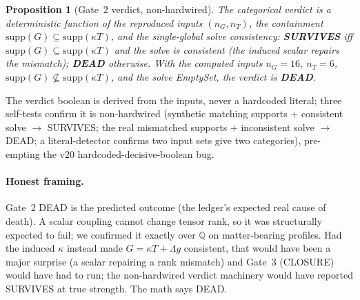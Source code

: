 \documentclass[11pt]{article}
\newtheorem{proposition}{Proposition}
\newcommand{\QQ}{\mathbb{Q}}
\newcommand{\supp}{\mathrm{supp}}
\begin{document}
\begin{proposition}[Gate~2 verdict, non-hardwired]\label{prop:verdict}
The categorical verdict is a deterministic function of the reproduced inputs $(n_G,n_T)$, the
containment $\supp(G)\subseteq\supp(\kappa T)$, and the single-global solve consistency:
\textbf{SURVIVES} iff $\supp(G)\subseteq\supp(\kappa T)$ and the solve is consistent (the induced
scalar repairs the mismatch); \textbf{DEAD} otherwise. With the computed inputs $n_G=16$,
$n_T=6$, $\supp(G)\not\subseteq\supp(\kappa T)$, and the solve \textsf{EmptySet}, the verdict is
\textbf{DEAD}.
\end{proposition}

The verdict boolean is derived from the inputs, never a hardcoded literal; three self-tests
confirm it is non-hardwired (synthetic matching supports $+$ consistent solve $\to$ SURVIVES;
the real mismatched supports $+$ inconsistent solve $\to$ DEAD; a literal-detector confirms two
input sets give two categories), pre-empting the v20 hardcoded-decisive-boolean bug.

\begin{center}\end{center}

\paragraph{Honest framing.} Gate~2 DEAD is the predicted outcome (the ledger's expected real
cause of death). A scalar coupling cannot change tensor rank, so it was structurally expected to
fail; we confirmed it exactly over $\QQ$ on matter-bearing profiles. Had the induced $\kappa$
instead made $G=\kappa T+\Lambda g$ consistent, that would have been a major surprise (a scalar
repairing a rank mismatch) and Gate~3 (CLOSURE) would have had to run; the non-hardwired verdict
machinery would have reported SURVIVES at true strength. The math says DEAD.
\end{document}
